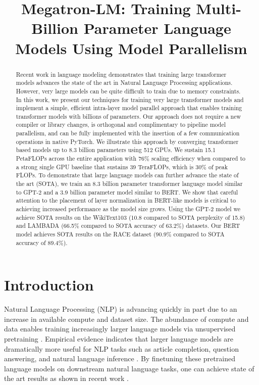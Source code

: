 \title{Megatron-LM: Training Multi-Billion Parameter Language Models Using Model Parallelism}

\begin{abstract}
Recent work in language modeling demonstrates that training large transformer models advances the state of the art in Natural Language Processing applications. However, very large models can be quite difficult to train due to memory constraints. In this work, we present our techniques for training very large transformer models and implement a simple, efficient intra-layer model parallel approach that enables training transformer models with billions of parameters. Our approach does not require a new compiler or library changes, is orthogonal and complimentary to pipeline model parallelism, and can be fully implemented with the insertion of a few communication operations in native PyTorch. We illustrate this approach by converging transformer based models up to 8.3 billion parameters using 512 GPUs. We sustain 15.1 PetaFLOPs  across the entire application with 76\% scaling efficiency when compared to a strong single GPU baseline that sustains 39 TeraFLOPs, which is 30\% of peak FLOPs. To demonstrate that large language models can further advance the state of the art (SOTA), we train an 8.3 billion parameter transformer language model similar to GPT-2 and a 3.9 billion parameter model similar to BERT. We show that careful attention to the placement of layer normalization in BERT-like models is critical to achieving increased performance as the model size grows. Using the GPT-2 model we achieve SOTA results on the WikiText103 (10.8 compared to SOTA perplexity of 15.8) and LAMBADA (66.5\% compared to SOTA accuracy of 63.2\%) datasets. Our BERT model achieves SOTA results on the RACE dataset (90.9\% compared to SOTA accuracy of 89.4\%).
\end{abstract}

\section{Introduction}

Natural Language Processing (NLP) is advancing quickly in part due to an increase in available compute and dataset size. The abundance of compute and data enables training increasingly larger language models via unsupervised pretraining \citep{devlin2018bert,Radford2019GPT2}. Empirical evidence indicates that larger language models are dramatically more useful for NLP tasks such as article completion, question answering, and natural language inference \cite{ALBERT2019,T5}. By finetuning these pretrained language models on downstream natural language tasks, one can achieve state of the art results as shown in recent work \cite{devlin2018bert, ELMo, Howard2018ULMFIT, Radford2018GPT, Radford2017Sentiment, Le2016seq2seqtransfer, roberta,transformerxl,xlnet,mtdnn,ALBERT2019}. 

